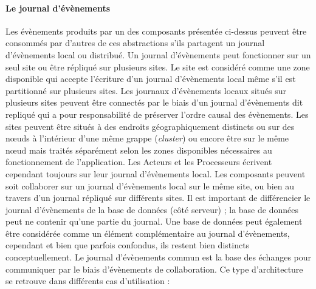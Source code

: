 \paragraph{Le journal d'évènements}
Les évènements produits par un des composants présentée ci-dessus
peuvent être consommés par d'autres de ces abstractions s'ils partagent un 
journal d'évènements local ou distribué. Un journal d'évènements peut 
fonctionner sur un seul site ou être répliqué 
sur plusieurs sites. 
Le site est considéré comme une zone disponible qui accepte 
l'écriture d'un journal d'évènements local même s'il est partitionné sur plusieurs 
sites. Les journaux d'évènements locaux situés sur plusieurs sites peuvent être 
connectés par le biais d'un journal d'évènements dit \og repliqué\fg{} qui a pour 
responsabilité de préserver l'ordre causal des évènements.
Les sites peuvent être situés à des endroits géographiquement distincts ou sur 
des nœuds à l'intérieur d'une même grappe (\textit{cluster}) ou encore être sur le 
même nœud mais traités séparément selon les zones 
disponibles nécessaires au fonctionnement de l'application. 
Les Acteurs et les Processeurs écrivent cependant toujours sur leur journal 
d'évènements local. 
Les composants peuvent soit collaborer sur un journal d'évènements local sur le 
même site, ou bien au travers d'un journal répliqué sur différents sites.
Il est important de différencier le journal d'évènements de la base de données 
(côté serveur) ; la base de données peut ne contenir qu'une partie du journal. 
Une base de données peut également être considérée comme un élément 
complémentaire au journal d'évènements, cependant et bien que parfois 
confondus, ils restent bien distincts conceptuellement.
Le journal d'évènements commun est la base des échanges pour communiquer 
par le biais d'évènements de collaboration. Ce type d'architecture se retrouve dans 
différents cas d'utilisation :
